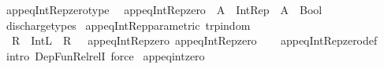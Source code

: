 \begin{isabellebody}
\isanewline
{}\isamarkupfalse%
\ app{\isacharunderscore}{\kern0pt}eq{\isacharunderscore}{\kern0pt}Int{\isacharunderscore}{\kern0pt}Rep{\isacharunderscore}{\kern0pt}zero{\isacharunderscore}{\kern0pt}type{\isacharcolon}{\kern0pt}\isanewline
\ \ {\isachardoublequoteopen}app{\isacharunderscore}{\kern0pt}eq{\isacharunderscore}{\kern0pt}Int{\isacharunderscore}{\kern0pt}Rep{\isacharunderscore}{\kern0pt}zero\ {\isacharcolon}{\kern0pt}\ {\isacharparenleft}{\kern0pt}A\ {\isasymRightarrow}\ Int{\isacharunderscore}{\kern0pt}Rep{\isacharparenright}{\kern0pt}\ {\isasymRightarrow}\ A\ {\isasymRightarrow}\ Bool{\isachardoublequoteclose}\isanewline
%
\isadelimproof
\ \ %
\endisadelimproof
%
\isatagproof
{}\isamarkupfalse%
\ discharge{\isacharunderscore}{\kern0pt}types%
\endisatagproof
{\isafoldproof}%
%
\isadelimproof
\isanewline
%
\endisadelimproof
\isanewline
{}\isamarkupfalse%
\ app{\isacharunderscore}{\kern0pt}eq{\isacharunderscore}{\kern0pt}Int{\isacharunderscore}{\kern0pt}Rep{\isacharunderscore}{\kern0pt}parametric\ {\isacharbrackleft}{\kern0pt}trp{\isacharunderscore}{\kern0pt}in{\isacharunderscore}{\kern0pt}dom{\isacharbrackright}{\kern0pt}{\isacharcolon}{\kern0pt}\isanewline
\ \ {\isachardoublequoteopen}{\isacharparenleft}{\kern0pt}{\isacharparenleft}{\kern0pt}R\ {\isasymRrightarrow}\ Int{\isachardot}{\kern0pt}L{\isacharparenright}{\kern0pt}\ {\isasymRrightarrow}\ R\ {\isasymRrightarrow}\ {\isacharparenleft}{\kern0pt}{\isasymlongleftrightarrow}{\isacharparenright}{\kern0pt}{\isacharparenright}{\kern0pt}\ app{\isacharunderscore}{\kern0pt}eq{\isacharunderscore}{\kern0pt}Int{\isacharunderscore}{\kern0pt}Rep{\isacharunderscore}{\kern0pt}zero\ app{\isacharunderscore}{\kern0pt}eq{\isacharunderscore}{\kern0pt}Int{\isacharunderscore}{\kern0pt}Rep{\isacharunderscore}{\kern0pt}zero{\isachardoublequoteclose}\isanewline
%
\isadelimproof
\ \ %
\endisadelimproof
%
\isatagproof
{}\isamarkupfalse%
\ app{\isacharunderscore}{\kern0pt}eq{\isacharunderscore}{\kern0pt}Int{\isacharunderscore}{\kern0pt}Rep{\isacharunderscore}{\kern0pt}zero{\isacharunderscore}{\kern0pt}def\isanewline
\ \ \isamarkupfalse%
\ {\isacharparenleft}{\kern0pt}intro\ Dep{\isacharunderscore}{\kern0pt}Fun{\isacharunderscore}{\kern0pt}Rel{\isacharunderscore}{\kern0pt}relI{\isacharparenright}{\kern0pt}\ force%
\endisatagproof
{\isafoldproof}%
%
\isadelimproof
\isanewline
%
\endisadelimproof
\isanewline
{}\isamarkupfalse%
\ app{\isacharunderscore}{\kern0pt}eq{\isacharunderscore}{\kern0pt}int{\isacharunderscore}{\kern0pt}zero\isanewline

\end{isabellebody}
